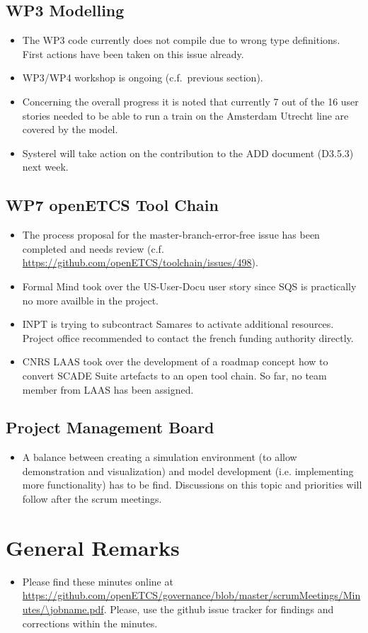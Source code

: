 \documentclass[a4paper, 11pt]{article}
\begin{document}
\subsection{WP3 Modelling}
\begin{itemize}
\item The WP3 code currently does not compile due to wrong type definitions. First actions have been taken on this issue already.
\item WP3/WP4 workshop is ongoing (c.f.~previous section).
\item Concerning the overall progress it is noted that currently 7 out of the 16 user stories needed to be able to run a train on the Amsterdam Utrecht line are covered by the model.
\item Systerel will take action on the contribution to the ADD document (D3.5.3) next week.
\end{itemize}

\subsection{WP7 openETCS Tool Chain}

\begin{itemize}
\item The process proposal for the master-branch-error-free issue has been completed and needs review (c.f. \url{https://github.com/openETCS/toolchain/issues/498}).
\item Formal Mind took over the US-User-Docu user story since SQS is practically no more availble in the project.
\item INPT is trying to subcontract Samares to activate additional resources. Project office recommended to contact the french funding authority directly.
\item CNRS LAAS took over the development of a roadmap concept how to convert SCADE Suite artefacts to an open tool chain. So far, no team member from LAAS has been assigned.
\end{itemize}

\subsection{Project Management Board}
\begin{itemize}
\item A balance between creating a simulation environment (to allow demonstration and visualization) and model development (i.e. implementing more functionality) has to be find. Discussions on this topic and priorities will follow after the scrum meetings.
\end{itemize}


\section{General Remarks}

\begin{itemize}
\item Please find these minutes online at \url{https://github.com/openETCS/governance/blob/master/scrumMeetings/Minutes/\jobname.pdf}. Please, use the github issue tracker for findings and corrections within the minutes.
\end{itemize}
\end{document}
